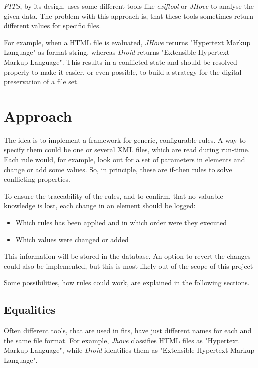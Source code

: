 \documentclass[a4paper,12pt]{article}
\begin{document}
\emph{FITS}, by its design, uses some different tools like \emph{exiftool} or \emph{JHove} to analyse the given data. The problem with this approach is, that these tools sometimes return different values for specific files.

For example, when a HTML file is evaluated, \emph{JHove} returns "Hypertext Markup Language" as format string, whereas \emph{Droid} returns "Extensible Hypertext Markup Language". This results in a conflicted state and should be resolved properly to make it easier, or even possible, to build a strategy for the digital preservation of a file set.

\clearpage

\section{Approach}

The idea is to implement a framework for generic, configurable rules. A way to specify them could be one or several XML files, which are read during run-time.
Each rule would, for example, look out for a set of parameters in elements and change or add some values. So, in principle, these are if-then rules to solve conflicting properties.

To ensure the traceability of the rules, and to confirm, that no valuable knowledge is lost, each change in an element should be logged:

\begin{itemize}
\item Which rules has been applied and in which order were they executed
\item Which values were changed or added
\end{itemize}

This information will be stored in the database. An option to revert the changes could also be implemented, but this is most likely out of the scope of this project

Some possibilities, how rules could work, are explained in the following sections.

\subsection{Equalities}

Often different tools, that are used in fits, have just different names for each and the same file format. For example, \emph{Jhove} classifies HTML files as "Hypertext Markup Language", while \emph{Droid} identifies them as "Extensible Hypertext Markup Language".
\end{document}
